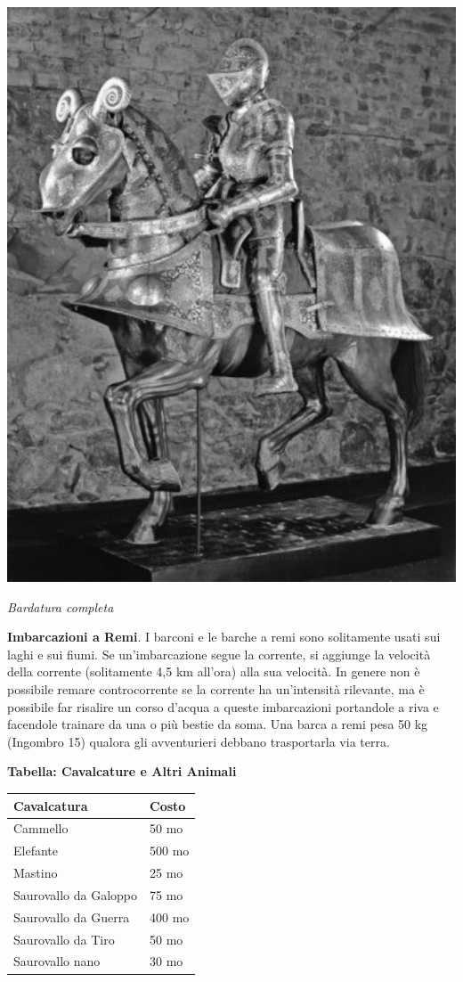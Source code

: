 \begin{multicols}{2}
\begin{center}
	\includegraphics[width=0.8\linewidth]{immagini/bardatura.png}

	\emph{Bardatura completa}
\end{center}

\textbf{Imbarcazioni a Remi}\hypertarget{Barca a remi}{}\label{Barca a remi}. I barconi e le barche a remi sono solitamente usati sui laghi e sui fiumi. Se un'imbarcazione segue la corrente, si aggiunge la velocità della corrente (solitamente 4,5 km all'ora) alla sua velocità. In genere non è possibile remare controcorrente se la corrente ha un'intensità rilevante, ma è possibile far risalire un corso d'acqua a queste imbarcazioni portandole a riva e facendole trainare da una o più bestie da soma. Una barca a remi pesa 50 kg (Ingombro 15) qualora gli avventurieri debbano trasportarla via terra.

\medskip

\textbf{Tabella: Cavalcature e Altri Animali}\label{costicavalcature}

\noindent\begin{tabularx}{\linewidth}{Xl}
\toprule
\rowcolor{gray!20}\textbf{Cavalcatura}&\textbf{Costo}\\
\toprule
Cammello&50 mo\\
\rowcolor{gray!20}Elefante&500 mo\\
Mastino&25 mo\\
\rowcolor{gray!20}Saurovallo da Galoppo&75 mo\\
Saurovallo da Guerra&400 mo\\
\rowcolor{gray!20}Saurovallo da Tiro&50 mo\\
Saurovallo nano&30 mo
\end{tabularx}


\end{multicols}
